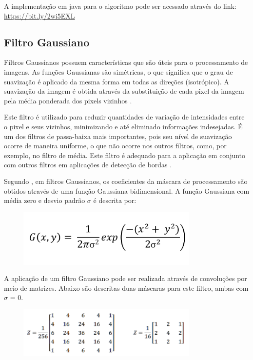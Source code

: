 \documentclass[
	12pt,				%
	oneside,			%
	a4paper,			%
	english,			%
	french,				%
	spanish,			%
	brazil,				%
	]{abntex2}
\begin{document}
A implementação em java para o algoritmo pode ser acessado através do link: \url{https://bit.ly/2wi5EXL} 

\subsection{Filtro Gaussiano}
Filtros Gaussianos possuem características que são úteis para o processamento de imagens. As funções Gaussianas são simétricas, o que significa que o grau de suavização é aplicado da mesma forma em todas as direções (isotrópico). A suavização da imagem é obtida através da substituição de cada pixel da imagem pela média ponderada dos pixels vizinhos \cite{pedriniSchwartz:2008}. 

Este filtro é utilizado para reduzir quantidades de variação de intensidades entre o pixel e seus vizinhos, minimizando e até eliminado informações indesejadas. É um dos filtros de passa-baixa mais importantes, pois seu nível de suavização ocorre de maneira uniforme, o que não ocorre nos outros filtros, como, por exemplo, no filtro de média. Este filtro é adequado para a aplicação em conjunto com outros filtros em aplicações de detecção de bordas \cite{conciAzevedoLeta:2008}.   

Segundo \citet{pedriniSchwartz:2008}, em filtros Gaussianos, os coeficientes da máscara de processamento são obtidos através de uma função Gaussiana bidimensional. A função Gaussiana com média zero e desvio padrão \(\sigma\) é descrita por:

\begin{figure}[ht]
\centering
\includegraphics[width=0.8\textwidth]{imagens/gauss_formula.png}
\end{figure}

A aplicação de um filtro Gaussiano pode ser realizada através de convoluções por meio de matrizes. Abaixo são descritas duas máscaras para este filtro, ambas com \(\sigma\) = 0.

\begin{figure}[ht]
\centering
\includegraphics[width=0.8\textwidth]{imagens/gauss_mascara.png}
\end{figure}
\end{document}
